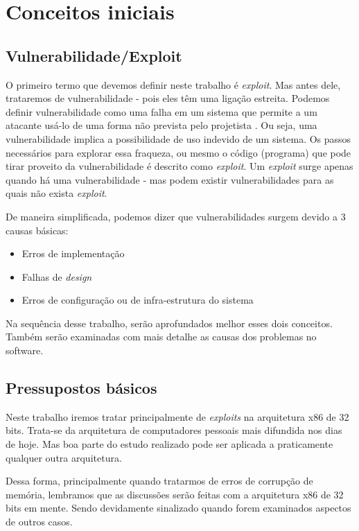
\chapter{Conceitos iniciais}
\label{chap:conceitos_iniciais}

	\section{Vulnerabilidade/Exploit}
	\label{sec:vuln_exploit}
	O primeiro termo que devemos definir neste trabalho é \textsl{exploit}. Mas antes dele,
	trataremos de vulnerabilidade - pois eles têm uma ligação estreita.
	Podemos definir vulnerabilidade como uma falha em um sistema que permite
	a um atacante usá-lo de uma forma não prevista pelo projetista \cite{Anley2007}.
	Ou seja, uma vulnerabilidade implica a possibilidade de uso indevido de um sistema.
	Os passos necessários para explorar essa fraqueza, ou mesmo o código (programa) que pode tirar
	proveito da vulnerabilidade é descrito como \textsl{exploit}.
	Um \textsl{exploit} surge apenas quando há uma vulnerabilidade - mas podem existir
	vulnerabilidades para as quais não exista \textsl{exploit}.

	De maneira simplificada, podemos dizer que vulnerabilidades surgem devido a 3 causas básicas:
	\begin{itemize}
		\item{Erros de implementação}
		\item{Falhas de \textsl{design}}
		\item{Erros de configuração ou de infra-estrutura do sistema}
	\end{itemize}

	
	Na sequência desse trabalho, serão aprofundados melhor esses dois conceitos. Também
	serão examinadas com mais detalhe as causas dos problemas no software.

	\section{Pressupostos básicos}
		Neste trabalho iremos tratar principalmente de \textsl{exploits} na arquitetura x86 de 32 bits. 
		Trata-se da arquitetura de computadores
		pessoais mais difundida nos dias de hoje. Mas boa parte do estudo realizado pode ser aplicada
		a praticamente qualquer outra arquitetura.


		Dessa forma, principalmente quando tratarmos de erros de corrupção de memória, lembramos
		que as discussões serão feitas com a arquitetura x86 de 32 bits em mente. Sendo devidamente
		sinalizado quando forem examinados aspectos de outros casos. 

